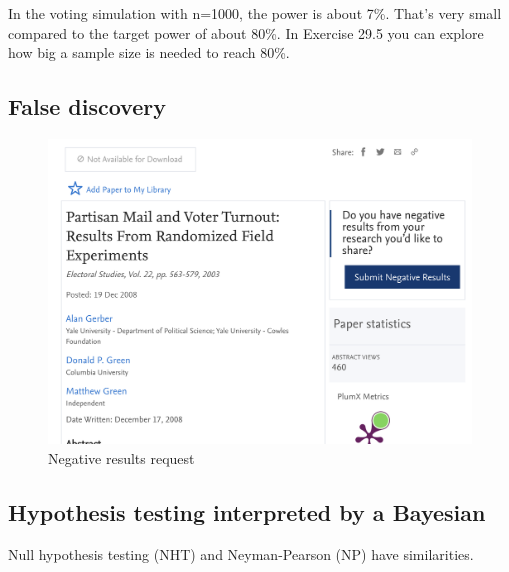 \documentclass[
  letterpaper,
  DIV=11,
  numbers=noendperiod,
  oneside]{scrartcl}
\begin{document}
In the voting simulation with n=1000, the power is about 7\%. That's
very small compared to the target power of about 80\%. In Exercise 29.5
you can explore how big a sample size is needed to reach 80\%.

\subsection{False discovery}\label{false-discovery}

\begin{figure}[H]

{\centering \includegraphics{www/negative-results.png}

}

\caption{Negative results request}

\end{figure}%

\subsection{Hypothesis testing interpreted by a
Bayesian}\label{hypothesis-testing-interpreted-by-a-bayesian}

Null hypothesis testing (NHT) and Neyman-Pearson (NP) have similarities.
\end{document}
